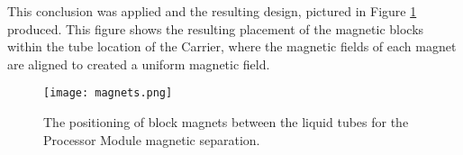 This conclusion was applied and the resulting design, pictured in Figure \ref{fig:magnets} produced. This figure shows the resulting placement of the magnetic blocks within the tube location of the Carrier, where the magnetic fields of each magnet are aligned to created a uniform magnetic field.

\begin{figure}[!htb]
	\centering
	\texttt{[image: magnets.png]}
	\caption[Processor Module Magnet Positioning.]{The positioning of block magnets between the liquid tubes for the Processor Module magnetic separation.}
	\label{fig:magnets}
\end{figure} 
\FloatBarrier